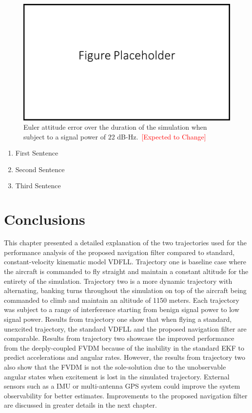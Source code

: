 \begin{figure}[!ht]
    \centering
    \includegraphics[width=0.5\linewidth]{Figures/FigurePlaceholder.png}
    \caption{Euler attitude error over the duration of the simulation when subject to a signal power of \(22\) dB-Hz.~\textcolor{red}{[Expected to Change]}}\label{fig:Eulerror222}
\end{figure}

\begin{enumerate}
    \item First Sentence
    \item Second Sentence
    \item Third Sentence
\end{enumerate}
\clearpage

\section{\textbf{Conclusions}}

This chapter presented a detailed explanation of the two trajectories used for the performance analysis of the proposed navigation filter compared to standard, constant-velocity kinematic model VDFLL\@. Trajectory one is baseline case where the aircraft is commanded to fly straight and maintain a constant altitude for the entirety of the simulation. Trajectory two is a more dynamic trajectory with alternating, banking turns throughout the simulation on top of the aircraft being commanded to climb and maintain an altitude of 1150 meters. Each trajectory was subject to a range of interference starting from benign signal power to low signal power. Results from trajectory one show that when flying a standard, unexcited trajectory, the standard VDFLL and the proposed navigation filter are comparable. Results from trajectory two showcase the improved performance from the deeply-coupled FVDM because of the inability in the standard EKF to predict accelerations and angular rates. However, the results from trajectory two also show that the FVDM is not the sole-solution due to the unobservable angular states when excitement is lost in the simulated trajectory. External sensors such as a IMU or multi-antenna GPS system could improve the system observability for better estimates. Improvements to the proposed navigation filter are discussed in greater details in the next chapter.